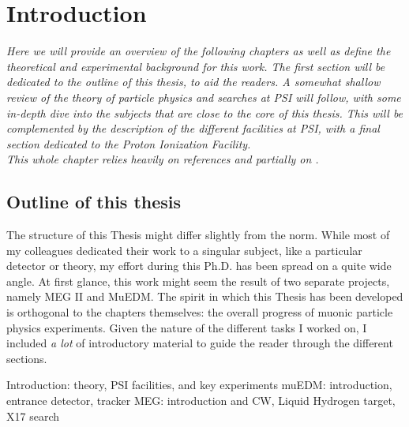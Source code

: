 \chapter{Introduction}

\begin{refsection}

{\itshape
Here we will provide an overview of the following chapters as well as define the theoretical and experimental background for this work. 
The first section will be dedicated to the outline of this thesis, to aid the readers. 
A somewhat shallow review of the theory of particle physics and searches at PSI will follow, with some in-depth dive into the subjects that are close to the core of this thesis. 
This will be complemented by the description of the different facilities at PSI, with a final section dedicated to the Proton Ionization Facility.\\ 
This whole chapter relies heavily on references \cite{Signorelli} \cite{PSI:review:2021} and partially on \cite{mythesis}.}

\section{Outline of this thesis}
    The structure of this Thesis might differ slightly from the norm. 
    While most of my colleagues dedicated their work to a singular subject, like a particular detector or theory, my effort during this Ph.D. has been spread on a quite wide angle.
    At first glance, this work might seem the result of two separate projects, namely MEG II and MuEDM. 
    The spirit in which this Thesis has been developed is orthogonal to the chapters themselves: the overall progress of muonic particle physics experiments.
    Given the nature of the different tasks I worked on, I included \textit{a lot} of introductory material to guide the reader through the different sections.  
    
    \begin{outline}
        \1 Introduction: theory, PSI facilities, and key experiments
        \1 muEDM: introduction, entrance detector, tracker
        \1 MEG: introduction and CW, Liquid Hydrogen target, X17 search
    \end{outline}


\end{refsection}
